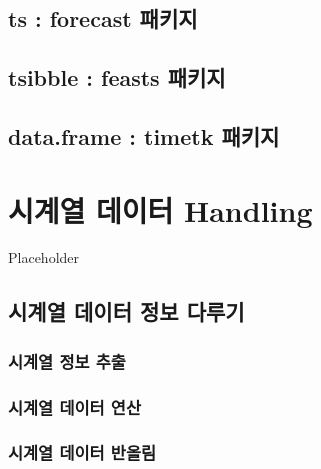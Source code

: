 \documentclass[
]{book}
\begin{document}
\hypertarget{ts-forecast-uxd328uxd0a4uxc9c0}{%
\section{ts : forecast 패키지}\label{ts-forecast-uxd328uxd0a4uxc9c0}}

\hypertarget{tsibble-feasts-uxd328uxd0a4uxc9c0}{%
\section{tsibble : feasts 패키지}\label{tsibble-feasts-uxd328uxd0a4uxc9c0}}

\hypertarget{data.frame-timetk-uxd328uxd0a4uxc9c0}{%
\section{data.frame : timetk 패키지}\label{data.frame-timetk-uxd328uxd0a4uxc9c0}}

\hypertarget{uxc2dcuxacc4uxc5f4-uxb370uxc774uxd130-handling}{%
\chapter{시계열 데이터 Handling}\label{uxc2dcuxacc4uxc5f4-uxb370uxc774uxd130-handling}}

Placeholder

\hypertarget{uxc2dcuxacc4uxc5f4-uxb370uxc774uxd130-uxc815uxbcf4-uxb2e4uxb8e8uxae30}{%
\section{시계열 데이터 정보 다루기}\label{uxc2dcuxacc4uxc5f4-uxb370uxc774uxd130-uxc815uxbcf4-uxb2e4uxb8e8uxae30}}

\hypertarget{uxc2dcuxacc4uxc5f4-uxc815uxbcf4-uxcd94uxcd9c}{%
\subsection{시계열 정보 추출}\label{uxc2dcuxacc4uxc5f4-uxc815uxbcf4-uxcd94uxcd9c}}

\hypertarget{uxc2dcuxacc4uxc5f4-uxb370uxc774uxd130-uxc5f0uxc0b0}{%
\subsection{시계열 데이터 연산}\label{uxc2dcuxacc4uxc5f4-uxb370uxc774uxd130-uxc5f0uxc0b0}}

\hypertarget{uxc2dcuxacc4uxc5f4-uxb370uxc774uxd130-uxbc18uxc62cuxb9bc}{%
\subsection{시계열 데이터 반올림}\label{uxc2dcuxacc4uxc5f4-uxb370uxc774uxd130-uxbc18uxc62cuxb9bc}}
\end{document}
